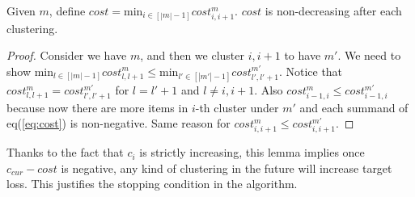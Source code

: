 	\begin{lemma}
	Given $m$,  define $cost=\text{min}_{i\in [|m|-1]} cost^m_{i, i+1}$. $cost$ is non-decreasing after each clustering.
	\end{lemma}
\begin{proof}
	Consider we have $m$, and then we cluster $i, i+1$ to have $m'$. We need to show $\text{min}_{l\in [|m|-1]} cost^m_{l, l+1}\leq \text{min}_{l'\in [|m'|-1]} cost^{m'}_{l', l'+1}$. Notice that $cost^m_{l, l+1}=cost^{m'}_{l', l'+1}$ for $l=l'+1$ and $l\not= i, i+1$. Also $cost^m_{i-1, i}\leq cost^{m'}_{i-1, i}$ because now there are more items in $i$-th cluster under $m'$ and each summand  of eq(\ref{eq:cost}) is non-negative. Same reason for $cost^m_{i, i+1}\leq cost^{m'}_{i, i+1}$. 
	\end{proof}
Thanks to the fact that $c_i$ is strictly increasing, this lemma implies once $c_{cur}-cost$ is negative, any kind of clustering in the future will increase target loss. This justifies the stopping condition in the algorithm. 

